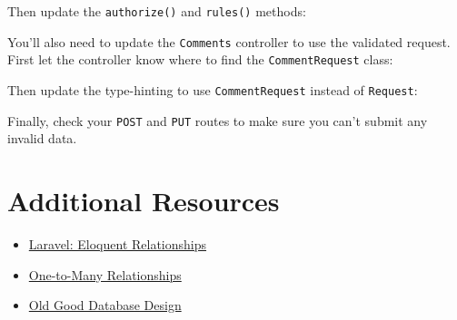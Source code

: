 Then update the \texttt{authorize()} and \texttt{rules()} methods:


You'll also need to update the \texttt{Comments} controller to use the validated request. First let the controller know where to find the \texttt{CommentRequest} class:


Then update the type-hinting to use \texttt{CommentRequest} instead of \texttt{Request}:


Finally, check your \texttt{POST} and \texttt{PUT} routes to make sure you can't submit any invalid data.


\section{Additional Resources}

\begin{itemize}[leftmargin=*]
    \item \href{http://laravel.com/docs/7.x/eloquent-relationships}{Laravel: Eloquent Relationships}
    \item \href{https://mysql.programmingpedia.net/en/tutorial/9600/one-to-many}{One-to-Many Relationships}
    \item \href{https://relinx.io/2020/09/14/old-good-database-design}{Old Good Database Design}
\end{itemize}
